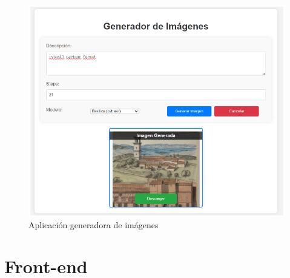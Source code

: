 \begin{figure}[!htb]
	\centering
	\includegraphics[width = 1
	\textwidth]{Imagenes/Vectorial/appgen.png}
	\caption{Aplicación generadora de imágenes}
	\label{fig:appgen}
\end{figure}




\section{Front-end}